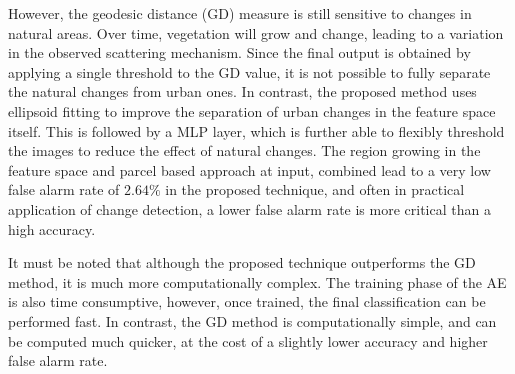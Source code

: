 However, the geodesic distance (GD) measure is still sensitive to changes in natural areas. Over time, vegetation will grow and change, leading to a variation in the observed scattering mechanism. Since the final output is obtained by applying a single threshold to the GD value, it is not possible to fully separate the natural changes from urban ones. In contrast, the proposed method uses ellipsoid fitting to improve the separation of urban changes in the feature space itself. This is followed by a MLP layer, which is further able to flexibly threshold the images to reduce the effect of natural changes. 
%
The region growing in the feature space and parcel based approach at input, combined lead to a very low false alarm rate of $2.64\%$ in the proposed technique, and often in practical application of change detection, a lower false alarm rate is more critical than a high accuracy. 

It must be noted that although the proposed technique outperforms the GD method, it is much more computationally complex. The training phase of the AE is also time consumptive, however, once trained, the final classification can be performed fast. In contrast, the GD method is computationally simple, and can be computed much quicker, at the cost of a slightly lower accuracy and higher false alarm rate. 

